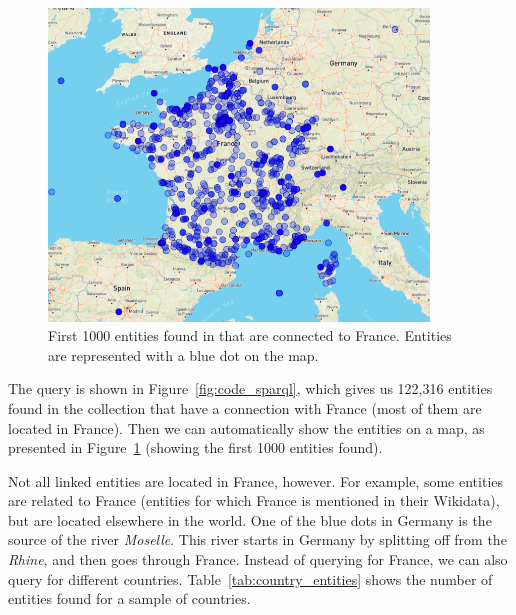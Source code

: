 \begin{figure}[!t]
	\centering
	\includegraphics[width=0.9\textwidth]{imgs/france.png}
	\caption{First 1000 entities found in that are connected to France. Entities are represented with a blue dot on the map.}
	\label{fig:france}
\end{figure}


The query is shown in Figure~\ref{fig:code_sparql}, which gives us 122,316 entities found in the collection that have a connection with France (most of them are located in France). Then we can automatically show the entities on a map, as presented in Figure~\ref{fig:france} (showing the first 1000 entities found). 

Not all linked entities are located in France, however. For example, some entities are related to France (entities for which France is mentioned in their Wikidata), but are located elsewhere in the world. One of the blue dots in Germany is the source of the river \emph{Moselle}. This river starts in Germany by splitting off from the \emph{Rhine}, and then goes through France. 
Instead of querying for France, we can also query for different countries. Table~\ref{tab:country_entities} shows the number of entities found for a sample of countries.

